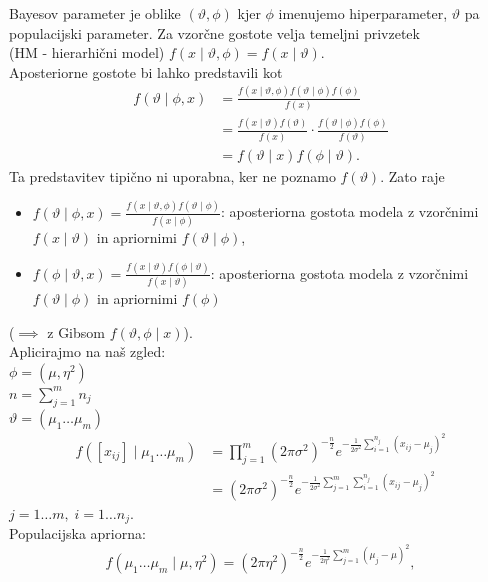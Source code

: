 \documentclass[a4paper, 12pt]{book}
\theoremstyle{definition}
\theoremstyle{remark}
\begin{document}
Bayesov parameter je oblike $(\vartheta, \phi)$ kjer $\phi$ imenujemo hiperparameter,
$\vartheta$ pa populacijski parameter.
Za vzorčne gostote velja temeljni privzetek \\
(HM - hierarhični model) $f(x \mid \vartheta, \phi) = f(x \mid \vartheta)$. \\
Aposteriorne gostote bi lahko predstavili kot
\begin{align*}
  f(\vartheta \mid \phi, x) &= \frac{f(x \mid \vartheta, \phi) f(\vartheta \mid \phi) f(\phi)}{f(x)} \\
  &= \frac{f(x \mid \vartheta) f(\vartheta)}{f(x)} \cdot \frac{f(\vartheta \mid \phi) f(\phi)}{f(\vartheta)} \\
  &= f(\vartheta \mid x) f(\phi \mid \vartheta).
\end{align*}
Ta predstavitev tipično ni uporabna, ker ne poznamo $f(\vartheta)$. Zato raje
\begin{itemize}
  \item $f(\vartheta \mid \phi, x) = \frac{f(x \mid \vartheta, \phi) f(\vartheta \mid \phi)}{f(x \mid \phi)}$:
    aposteriorna gostota modela z vzorčnimi $f(x \mid \vartheta)$ in apriornimi $f(\vartheta \mid \phi)$,
  \item $f(\phi \mid \vartheta, x) = \frac{f(x \mid \vartheta) f(\phi \mid \vartheta)}{f(x \mid \vartheta)}$:
    aposteriorna gostota modela z vzorčnimi $f(\vartheta \mid \phi)$ in apriornimi $f(\phi)$
\end{itemize}
($\implies$ z Gibsom $f(\vartheta, \phi \mid x)$). \\
Aplicirajmo na naš zgled: \\
$\phi = (\mu, \eta^2)$ \\
$n = \sum_{j=1}^{m} n_j$ \\
$\vartheta = (\mu_1 \dots \mu_m)$ \\
\begin{align*}
  f([x_{ij}] \mid \mu_1 \dots \mu_m) &= \prod_{j=1}^{m} \left(2 \pi \sigma^2\right)^{-\frac{n}{2}}
    e^{-\frac{1}{2 \sigma^2} \sum_{i=1}^{n_j} (x_{ij} - \mu_j)^2} \\
  &= \left(2 \pi \sigma^2\right)^{-\frac{n}{2}}
    e^{-\frac{1}{2 \sigma^2} \sum_{j=1}^{m} \sum_{i=1}^{n_j} (x_{ij} - \mu_j)^2}
\end{align*}
$j = 1 \dots m, \; i = 1 \dots n_j$. \\
Populacijska apriorna:
\begin{equation*}
  f(\mu_1 \dots \mu_m \mid \mu, \eta^2) = \left(2 \pi \eta^2\right)^{-\frac{n}{2}}
    e^{-\frac{1}{2 \eta^2} \sum_{j=1}^{m} (\mu_j - \mu)^2},
\end{equation*}
\end{document}
